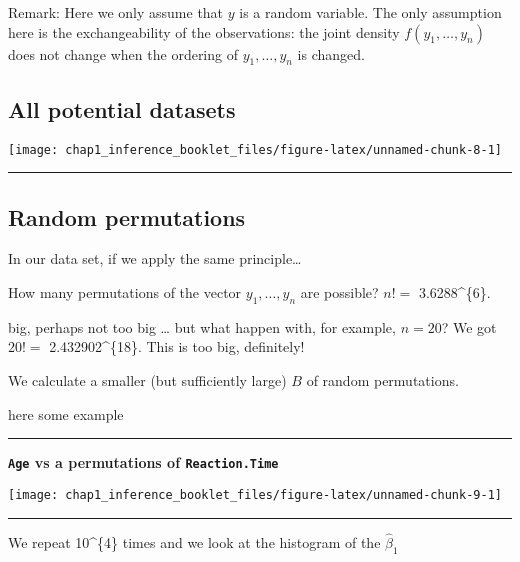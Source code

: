 \documentclass[]{article}
\begin{document}
Remark: Here we only assume that \(y\) is a random variable. The only
assumption here is the exchangeability of the observations: the joint
density \(f(y_1,\ldots,y_n)\) does not change when the ordering of
\(y_1,\ldots,y_n\) is changed.

\subsection{All potential datasets}\label{all-potential-datasets}

\begin{center}\texttt{[image: chap1\_inference\_booklet\_files/figure-latex/unnamed-chunk-8-1]} \end{center}

\begin{center}\rule{0.5\linewidth}{\linethickness}\end{center}

\subsection{Random permutations}\label{random-permutations}

In our data set, if we apply the same principle\ldots{}

How many permutations of the vector \(y_1,\ldots,y_n\) are possible?
\(n!=\) 3.6288\^{}\{6\}.

big, perhaps not too big \ldots{} but what happen with, for example,
\(n=20\)? We got \(20!=\) 2.432902\^{}\{18\}. This is too big,
definitely!

We calculate a smaller (but sufficiently large) \(B\) of random
permutations.

here some example

\begin{center}\rule{0.5\linewidth}{\linethickness}\end{center}

\textbf{\texttt{Age} vs a permutations of \texttt{Reaction.Time}}

\begin{center}\texttt{[image: chap1\_inference\_booklet\_files/figure-latex/unnamed-chunk-9-1]} \end{center}

\begin{center}\rule{0.5\linewidth}{\linethickness}\end{center}

We repeat 10\^{}\{4\} times and we look at the histogram of the
\(\hat{\beta}_1\)
\end{document}
